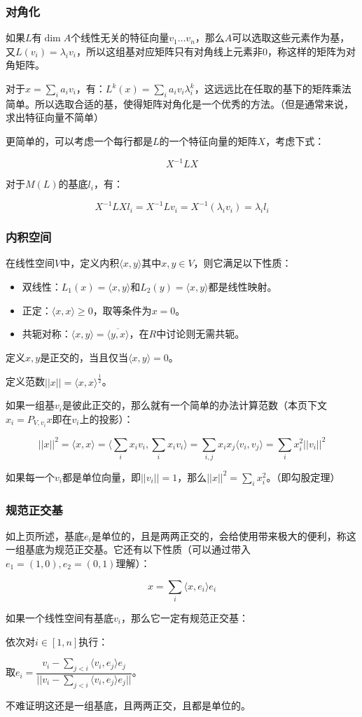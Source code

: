 \documentclass[10pt]{beamer}
\begin{document}
	\begin{frame}
		\frametitle{对角化}

		如果$L$有$\dim A$个线性无关的特征向量$v_1\dots v_n$，那么$A$可以选取这些元素作为基，又$L(v_i)=\lambda_i v_i$，所以这组基对应矩阵只有对角线上元素非$0$，称这样的矩阵为对角矩阵。

		对于$x=\sum_i a_iv_i$，有：$L^k(x)=\sum_i a_iv_i\lambda_i^k$，这远远比在任取的基下的矩阵乘法简单。所以选取合适的基，使得矩阵对角化是一个优秀的方法。（但是通常来说，求出特征向量不简单）

		更简单的，可以考虑一个每行都是$L$的一个特征向量的矩阵$X$，考虑下式：

		$$
		X^{-1}LX
		$$

		对于$M(L)$的基底$l_i$，有：

		$$
		X^{-1}LXl_i=X^{-1}Lv_i=X^{-1}(\lambda_iv_i)=\lambda_il_i
		$$

	\end{frame}
	\begin{frame}
		\frametitle{内积空间}
	
		在线性空间$V$中，定义内积$\langle x,y\rangle $其中$x,y\in V$，则它满足以下性质：

		\begin{itemize}
			\item 双线性：$L_1(x)=\langle x,y\rangle $和$L_2(y)=\langle x,y\rangle $都是线性映射。
			\item 正定：$\langle x,x\rangle\ge 0$，取等条件为$x=0$。
			\item 共轭对称：$\langle x,y\rangle=\overline{\langle y,x\rangle}$，在$R$中讨论则无需共轭。
		\end{itemize}

		定义$x,y$是正交的，当且仅当$\langle x,y\rangle=0$。

		定义范数$||x||=\langle x,x\rangle^{\frac 12}$。

		如果一组基$v_i$是彼此正交的，那么就有一个简单的办法计算范数（本页下文$x_i=P_{V,v_i} x$即在$v_i$上的投影）：

		$$
		||x||^2=\langle x,x\rangle=\langle \sum_i x_iv_i,\sum_i x_iv_i\rangle=\sum_{i,j}x_ix_j\langle v_i,v_j\rangle=\sum_i x_i^2 ||v_i||^2
		$$

		如果每一个$v_i$都是单位向量，即$||v_i||=1$，那么$||x||^2=\sum_i x_i^2$。（即勾股定理）
	
	\end{frame}
	\begin{frame}
		\frametitle{规范正交基}
	
		如上页所述，基底$e_i$是单位的，且是两两正交的，会给使用带来极大的便利，称这一组基底为规范正交基。它还有以下性质（可以通过带入$e_1=(1,0),e_2=(0,1)$理解）：

		$$
		x=\sum_i \langle x,e_i\rangle e_i
		$$

		如果一个线性空间有基底$v_i$，那么它一定有规范正交基：

		依次对$i\in[1,n]$执行：

		取$e_i=\dfrac{v_i-\sum_{j<i}\langle v_i,e_j\rangle e_j}{||v_i-\sum_{j<i}\langle v_i,e_j\rangle e_j||}$。

		不难证明这还是一组基底，且两两正交，且都是单位的。
	
	\end{frame}
\end{document}
